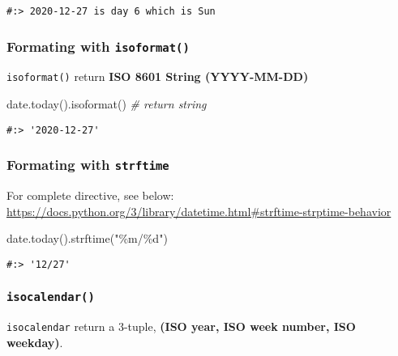 \documentclass[
]{book}
\newenvironment{Shaded}{\begin{snugshade}}{\end{snugshade}}
\newcommand{\CommentTok}[1]{\textcolor[rgb]{0.37,0.37,0.37}{\textit{#1}}}
\newcommand{\NormalTok}[1]{#1}
\newcommand{\SpecialCharTok}[1]{\textcolor[rgb]{0,0,0}{#1}}
\newcommand{\StringTok}[1]{\textcolor[rgb]{0.5,0.5,0.5}{#1}}
\begin{document}
\begin{verbatim}
#:> 2020-12-27 is day 6 which is Sun
\end{verbatim}

\hypertarget{formating-with-isoformat}{%
\subsubsection{\texorpdfstring{Formating with \texttt{isoformat()}}{Formating with isoformat()}}\label{formating-with-isoformat}}

\texttt{isoformat()} return \textbf{ISO 8601 String (YYYY-MM-DD)}

\begin{Shaded}
\begin{Highlighting}[]
\NormalTok{date.today().isoformat() }\CommentTok{\# return string}
\end{Highlighting}
\end{Shaded}

\begin{verbatim}
#:> '2020-12-27'
\end{verbatim}

\hypertarget{formating-with-strftime}{%
\subsubsection{\texorpdfstring{Formating with \texttt{strftime}}{Formating with strftime}}\label{formating-with-strftime}}

For complete directive, see below:\\
\url{https://docs.python.org/3/library/datetime.html\#strftime-strptime-behavior}

\begin{Shaded}
\begin{Highlighting}[]
\NormalTok{date.today().strftime(}\StringTok{"\%m/}\SpecialCharTok{\%d}\StringTok{"}\NormalTok{)}
\end{Highlighting}
\end{Shaded}

\begin{verbatim}
#:> '12/27'
\end{verbatim}

\hypertarget{isocalendar}{%
\subsubsection{\texorpdfstring{\texttt{isocalendar()}}{isocalendar()}}\label{isocalendar}}

\texttt{isocalendar} return a 3-tuple, \textbf{(ISO year, ISO week number, ISO weekday)}.
\end{document}
